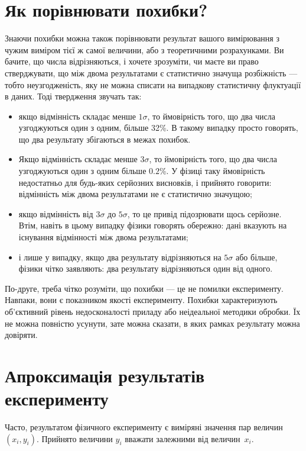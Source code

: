 \documentclass{LabBook}
\begin{document}
\chapter{Як порівнювати похибки?}


Знаючи похибки можна також порівнювати результат вашого вимірювання з чужим виміром тієї ж самої величини, або з теоретичними розрахунками. Ви бачите, що числа відрізняються, і хочете зрозуміти, чи маєте ви право стверджувати, що між двома результатами є статистично значуща розбіжність --- тобто неузгодженість, яку не можна списати на випадкову статистичну флуктуації в даних. Тоді твердження звучать так:

\begin{itemize}
	\item якщо відмінність складає менше $1\sigma$, то ймовірність того, що два числа узгоджуються один з одним, більше 32\%. В такому випадку просто говорять, що два результату збігаються в межах похибок.
	\item Якщо відмінність складає менше $3\sigma$, то ймовірність того, що два числа узгоджуються один з одним більше $0.2$\%. У фізиці таку ймовірність недостатньо для будь-яких серйозних висновків, і прийнято говорити: відмінність між двома результатами не є статистично значущою;
	\item якщо відмінність від $3\sigma$ до $5\sigma$, то це привід підозрювати щось серйозне. Втім, навіть в цьому випадку фізики говорять обережно: дані вказують на існування відмінності між двома результатами;
	\item і лише у випадку, якщо два результату відрізняються на $5\sigma$ або більше, фізики чітко заявляють: два результату відрізняються один від одного.
\end{itemize}

По-друге, треба чітко розуміти, що похибки --- це не помилки експерименту. Навпаки, вони є показником якості експерименту. Похибки характеризують об'єктивний рівень недосконалості приладу або неідеальної методики обробки. Їх не можна повністю усунути, зате можна сказати, в яких рамках результату можна довіряти.


\chapter{Апроксимація результатів експерименту}


Часто, результатом фізичного експерименту є виміряні значення пар величин $(x_i, y_i)$. Прийнято величини $y_i$ вважати залежними від величин~$x_i$.
\end{document}
